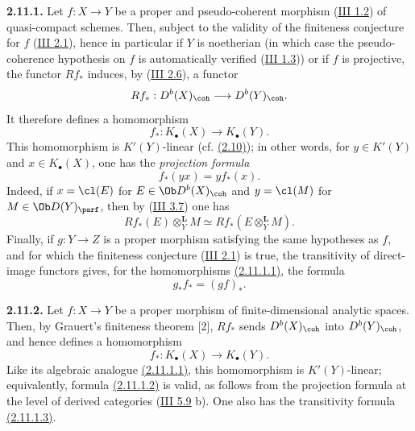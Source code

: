 \textbf{2.11.1.} Let \(f:X\to Y\) be a proper and pseudo-coherent morphism (\hyperlink{sga6.e03.def.1-2}{III 1.2}) of quasi-compact schemes. Then, subject to the validity of the finiteness conjecture for \(f\) (\hyperlink{sga6.e03.conj.2-1}{III 2.1}), hence in particular if \(Y\) is noetherian (in which case the pseudo-coherence hypothesis on \(f\) is automatically verified (\hyperlink{sga6.e03.ex.1-3}{III 1.3})) or if \(f\) is projective, the functor \(Rf_*\) induces, by (\hyperlink{sga6.e03.schol.2-6}{III 2.6}), a functor
\[
 Rf_*:D^b(X)_{\coh}\longrightarrow D^b(Y)_{\coh}.
\]
It therefore defines a homomorphism
\begin{equation}\tag{2.11.1.1}
 f_*:K_{\bullet}(X)\longrightarrow K_{\bullet}(Y).
\end{equation}
This homomorphism is \(K'(Y)\)-linear (cf. \hyperlink{sga6.e04.para.2-10}{(2.10)}); in other words, for \(y\in K'(Y)\) and \(x\in K_{\bullet}(X)\), one has the \emph{projection formula}
\begin{equation}\tag{2.11.1.2}
 f_*(yx)=y f_*(x).
\end{equation}
Indeed, if \(x=\cl(E)\) for \(E\in\Ob D^b(X)_{\coh}\) and \(y=\cl(M)\) for \(M\in\Ob D(Y)_{\parf}\), then by (\hyperlink{sga6.e03.prop.3-7}{III 3.7}) one has
\[
 Rf_*(E)\otimes_Y^{\mathbf L}M\simeq
 Rf_*(E\otimes_Y^{\mathbf L}M).
\]
Finally, if \(g:Y\to Z\) is a proper morphism satisfying the same hypotheses as \(f\), and for which the finiteness conjecture (\hyperlink{sga6.e03.conj.2-1}{III 2.1}) is true, the transitivity of direct-image functors gives, for the homomorphisms \hyperlink{sga6.e04.eq.2-11-1-1}{(2.11.1.1)}, the formula
\begin{equation}\tag{2.11.1.3}
 g_*f_*=(gf)_*.
\end{equation}

\textbf{2.11.2.} Let \(f:X\to Y\) be a proper morphism of finite-dimensional analytic spaces. Then, by Grauert's finiteness theorem [2], \(Rf_*\) sends \(D^b(X)_{\coh}\) into \(D^b(Y)_{\coh}\), and hence defines a homomorphism
\begin{equation}\tag{2.11.2.1}
 f_*:K_{\bullet}(X)\longrightarrow K_{\bullet}(Y).
\end{equation}
Like its algebraic analogue \hyperlink{sga6.e04.eq.2-11-1-1}{(2.11.1.1)}, this homomorphism is \(K'(Y)\)-linear; equivalently, formula \hyperlink{sga6.e04.eq.2-11-1-2}{(2.11.1.2)} is valid, as follows from the projection formula at the level of derived categories (\hyperlink{sga6.e03.rem.5-8}{III 5.9} b). One also has the transitivity formula \hyperlink{sga6.e04.eq.2-11-1-3}{(2.11.1.3)}.

